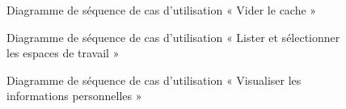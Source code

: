 \begin{figure}[H]
  \centering
  \caption{Diagramme de séquence de cas d'utilisation « Vider le cache »}
  \label{fig:sequence_clear_cache}
\end{figure}

\begin{figure}[H]
  \centering
  \caption{Diagramme de séquence de cas d'utilisation « Lister et sélectionner les espaces de travail »}
  \label{fig:sequence_lister_selectionner_workspaces}
\end{figure}

\begin{figure}[H]
  \centering
  \caption{Diagramme de séquence de cas d'utilisation « Visualiser les informations personnelles »}
  \label{fig:sequence_visualiser_profil}
\end{figure}

